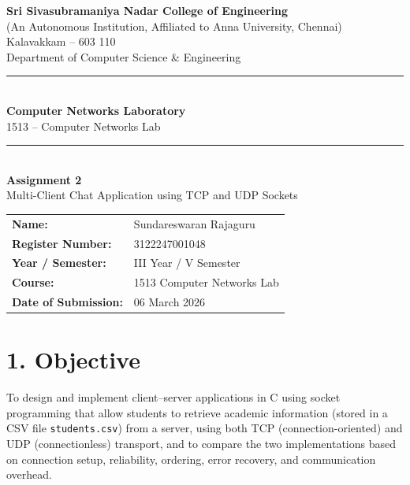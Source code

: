 \documentclass[11pt]{article}
\title{\vspace{-2cm}}
\date{}
\begin{document}
\begin{titlepage}
\centering
\vspace*{1cm}
{\large \textbf{Sri Sivasubramaniya Nadar College of Engineering}}\\
{\small (An Autonomous Institution, Affiliated to Anna University, Chennai)}\\
{\small Kalavakkam -- 603 110}\\[0.3cm]
{\small Department of Computer Science \& Engineering}\\[1.5cm]

\rule{\linewidth}{0.5mm}\\[0.4cm]
{\LARGE \textbf{Computer Networks Laboratory}}\\[0.3cm]
{\Large 1513 -- Computer Networks Lab}\\[0.4cm]
\rule{\linewidth}{0.5mm}\\[1.5cm]

{\huge \textbf{Assignment 2}}\\[0.4cm]
{\Large Multi-Client Chat Application using TCP and UDP Sockets}\\[2cm]

\begin{center}
\begin{tabular}{ll}
\textbf{Name:} & Sundareswaran Rajaguru \\[0.2cm]
\textbf{Register Number:} & 3122247001048 \\[0.2cm]
\textbf{Year / Semester:} & III Year / V Semester \\[0.2cm]
\textbf{Course:} & 1513 Computer Networks Lab \\[0.2cm]
\textbf{Date of Submission:} & 06 March 2026 \\[0.2cm]
\end{tabular}
\end{center}

\vfill
\end{titlepage}

\section*{1. Objective}
To design and implement client--server applications in C using socket programming that allow
students to retrieve academic information (stored in a CSV file \texttt{students.csv}) from a
server, using both TCP (connection-oriented) and UDP (connectionless) transport, and to compare
the two implementations based on connection setup, reliability, ordering, error recovery, and
communication overhead.
\end{document}
